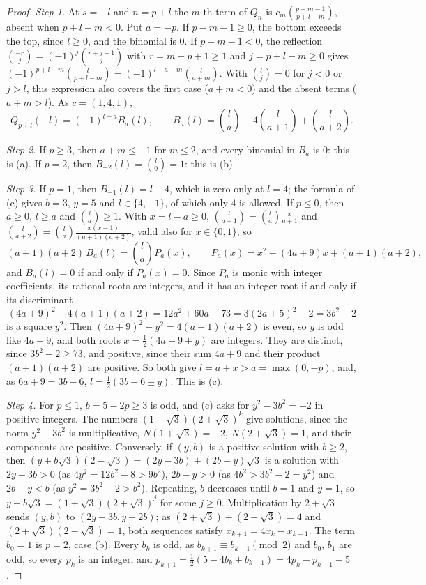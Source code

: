 \documentclass[11pt]{article}
\begin{document}
\begin{proof}
\emph{Step 1.} At $s=-l$ and $n=p+l$ the $m$-th term of $Q_n$ is $c_m\binom{p-m-1}{p+l-m}$, absent when $p+l-m<0$. Put $a=-p$. If $p-m-1\ge0$, the bottom exceeds the top, since $l\ge0$, and the binomial is $0$. If $p-m-1<0$, the reflection $\binom{-r}{j}=(-1)^j\binom{r+j-1}{j}$ with $r=m-p+1\ge1$ and $j=p+l-m\ge0$ gives $(-1)^{p+l-m}\binom{l}{p+l-m}=(-1)^{l-a-m}\binom{l}{a+m}$. With $\binom{l}{j}=0$ for $j<0$ or $j>l$, this expression also covers the first case ($a+m<0$) and the absent terms ($a+m>l$). As $c=(1,4,1)$,
\[
Q_{p+l}(-l)=(-1)^{l-a}B_a(l),\qquad B_a(l)=\binom{l}{a}-4\binom{l}{a+1}+\binom{l}{a+2}.\tag{V}
\]

\emph{Step 2.} If $p\ge3$, then $a+m\le-1$ for $m\le2$, and every binomial in $B_a$ is $0$: this is (a). If $p=2$, then $B_{-2}(l)=\binom{l}{0}=1$: this is (b).

\emph{Step 3.} If $p=1$, then $B_{-1}(l)=l-4$, which is zero only at $l=4$; the formula of (c) gives $b=3$, $y=5$ and $l\in\{4,-1\}$, of which only $4$ is allowed. If $p\le0$, then $a\ge0$, $l\ge a$ and $\binom{l}{a}\ge1$. With $x=l-a\ge0$, $\binom{l}{a+1}=\binom{l}{a}\frac{x}{a+1}$ and $\binom{l}{a+2}=\binom{l}{a}\frac{x(x-1)}{(a+1)(a+2)}$, valid also for $x\in\{0,1\}$, so
\[
(a+1)(a+2)\,B_a(l)=\binom{l}{a}P_a(x),\qquad P_a(x)=x^2-(4a+9)x+(a+1)(a+2),
\]
and $B_a(l)=0$ if and only if $P_a(x)=0$. Since $P_a$ is monic with integer coefficients, its rational roots are integers, and it has an integer root if and only if its discriminant
\[
(4a+9)^2-4(a+1)(a+2)=12a^2+60a+73=3(2a+5)^2-2=3b^2-2
\]
is a square $y^2$. Then $(4a+9)^2-y^2=4(a+1)(a+2)$ is even, so $y$ is odd like $4a+9$, and both roots $x=\frac12(4a+9\pm y)$ are integers. They are distinct, since $3b^2-2\ge73$, and positive, since their sum $4a+9$ and their product $(a+1)(a+2)$ are positive. So both give $l=a+x>a=\max(0,-p)$, and, as $6a+9=3b-6$, $l=\frac12(3b-6\pm y)$. This is (c).

\emph{Step 4.} For $p\le1$, $b=5-2p\ge3$ is odd, and (c) asks for $y^2-3b^2=-2$ in positive integers. The numbers $(1+\sqrt3)(2+\sqrt3)^k$ give solutions, since the norm $y^2-3b^2$ is multiplicative, $N(1+\sqrt3)=-2$, $N(2+\sqrt3)=1$, and their components are positive. Conversely, if $(y,b)$ is a positive solution with $b\ge2$, then $(y+b\sqrt3)(2-\sqrt3)=(2y-3b)+(2b-y)\sqrt3$ is a solution with $2y-3b>0$ (as $4y^2=12b^2-8>9b^2$), $2b-y>0$ (as $4b^2>3b^2-2=y^2$) and $2b-y<b$ (as $y^2=3b^2-2>b^2$). Repeating, $b$ decreases until $b=1$ and $y=1$, so $y+b\sqrt3=(1+\sqrt3)(2+\sqrt3)^j$ for some $j\ge0$. Multiplication by $2+\sqrt3$ sends $(y,b)$ to $(2y+3b,y+2b)$; as $(2+\sqrt3)+(2-\sqrt3)=4$ and $(2+\sqrt3)(2-\sqrt3)=1$, both sequences satisfy $x_{k+1}=4x_k-x_{k-1}$. The term $b_0=1$ is $p=2$, case (b). Every $b_k$ is odd, as $b_{k+1}\equiv b_{k-1}\pmod2$ and $b_0$, $b_1$ are odd, so every $p_k$ is an integer, and $p_{k+1}=\frac12(5-4b_k+b_{k-1})=4p_k-p_{k-1}-5$.


\end{proof}
\end{document}

